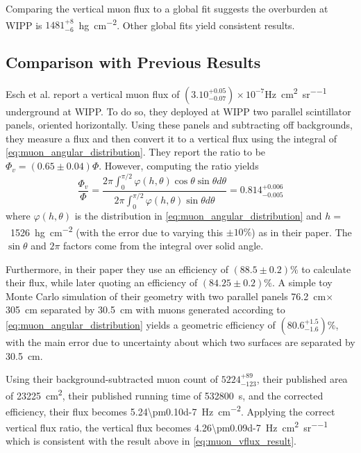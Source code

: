 \documentclass[herrin-thesis.tex]{subfiles}
\begin{document}
Comparing the vertical muon flux to a global fit \cite{Mei:2006qy} suggests the overburden at WIPP is \(1481^{+8}_{-6}\)~\si{\hecto\g\per\square\cm}. Other global fits \cite{miyake:1973,Crouch:1987ij} yield consistent results.

\subsection{Comparison with Previous Results}
Esch et al. \cite{Esch:2004zj} report a vertical muon flux of \((3.10^{+0.05}_{-0.07})\times10^{-7}\)\si{\Hz\per\square\cm\per\steradian} underground at WIPP. To do so, they deployed at WIPP two parallel scintillator panels, oriented horizontally. Using these panels and subtracting off backgrounds, they measure a flux and then convert it to a vertical flux using the integral of \cref{eq:muon_angular_distribution}. They report the ratio to be \(\Phi_v = (0.65\pm0.04)\Phi\). However, computing the ratio yields 
\begin{equation}
\label{eq:muon_esch_integral}
\frac{\Phi_v}{\Phi} = \frac{2 \pi \int_0^{\pi/2} \varphi(h,\theta)\cos\theta\sin\theta d\theta}{2 \pi \int_0^{\pi/2} \varphi(h,\theta)\sin\theta d\theta} = 0.814^{+0.006}_{-0.005}
\end{equation}
where \(\varphi(h,\theta)\) is the distribution in \cref{eq:muon_angular_distribution} and \(h = \)~\SI{1526}{\hecto\gram\per\square\cm} (with the error due to varying this \(\pm10\%\)) as in their paper. The \(\sin\theta\) and \(2 \pi\) factors come from the integral over solid angle.

Furthermore, in their paper they use an efficiency of \((88.5\pm0.2)\%\) to calculate their flux, while later quoting an efficiency of \((84.25\pm0.2)\%\). A simple toy Monte Carlo simulation of their geometry with two parallel panels \SI{76.2}{\cm}\(\times\)\SI{305}{\cm} separated by \SI{30.5}{\cm} with muons generated according to \cref{eq:muon_angular_distribution} yields a geometric efficiency of \((80.6^{+1.5}_{-1.6})\%\), with the main error due to uncertainty about which two surfaces are separated by \SI{30.5}{\cm}.

Using their background-subtracted muon count of \(5224^{+89}_{-123}\), their published area of \SI{23225}{\square\cm}, their published running time of \SI{532800}{s}, and the corrected efficiency, their flux becomes \SI{5.24\pm0.10d-7}{\Hz\per\square\cm}. Applying the correct vertical flux ratio, the vertical flux becomes \SI{4.26\pm0.09d-7}{\Hz\per\square\cm\per\steradian} which is consistent with the result above in \cref{eq:muon_vflux_result}.
\end{document}
